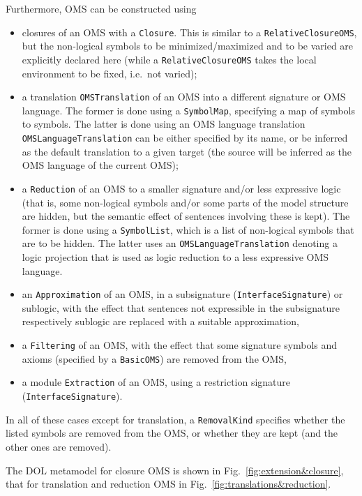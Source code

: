 \documentclass[10pt, a4paper]{isov2}
\newcommand*{\termref}[1]{\index{#1}#1\xspace}
\newcommand*{\syntax}[1]{\texttt{#1}}
\begin{document}
Furthermore, OMS can be constructed using 
\begin{itemize}
\item  closures of an OMS with a \syntax{Closure}.  This is
  similar to a \syntax{RelativeClosureOMS}, but the non-logical
  symbols to be  minimized/maximized and to be varied are
  explicitly declared here (while a \syntax{RelativeClosureOMS} takes
  the local environment to be fixed, i.e.\ not varied);
\item a translation \syntax{OMSTranslation} of an OMS into a different
  signature or OMS language. The former is done using a \syntax{SymbolMap},
  specifying a map of symbols to symbols. The latter is done using an 
  OMS language
  translation \syntax{OMSLanguageTranslation} can be either specified
  by its name, or be inferred as the \termref{default translation} to
  a given target (the source will be inferred as the OMS language of
  the current OMS);
\item a \syntax{Reduction} of an OMS to a smaller signature and/or
  less expressive logic (that is, some non-logical symbols and/or some
  parts of the model structure are hidden, but the semantic effect of
  sentences involving these is kept). The former is done using a
  \syntax{SymbolList}, which is a list of non-logical symbols that are
  to be hidden. The latter uses an \syntax{OMSLanguageTranslation}
  denoting a logic projection that is used as logic reduction to a
  less expressive OMS language.
\item an \syntax{Approximation} of an OMS, in a subsignature (\syntax{InterfaceSignature}) or sublogic, with the effect that sentences not expressible in the subsignature respectively sublogic are replaced with a suitable approximation,
\item a \syntax{Filtering} of an OMS, with the effect that some signature symbols and axioms (specified by a \syntax{BasicOMS}) are removed from the OMS,
\item a module \syntax{Extraction} of an OMS, using a restriction signature (\syntax{InterfaceSignature}).
\end{itemize}
In all of these cases except for translation, a \syntax{RemovalKind}
specifies whether the listed symbols are removed from the OMS, or
whether they are kept (and the other ones are removed).

The DOL metamodel for closure OMS is shown in
Fig.~\ref{fig:extension&closure}, that for translation and reduction
OMS in Fig.~\ref{fig:translations&reduction}. 
\end{document}
